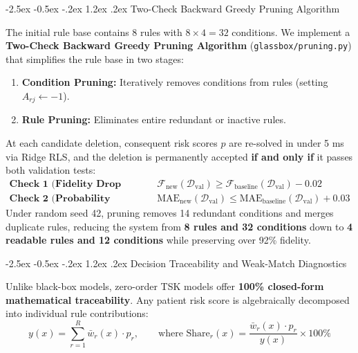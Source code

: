 \documentclass[12pt,a4paper,oneside]{report}
\makeatletter
\renewcommand\section{\@startsection {section}{1}{\z@}%
                                   {-2.5ex \@plus -0.5ex \@minus -.2ex}%
                                   {1.2ex \@plus .2ex}%
                                   {\normalfont\fontsize{13}{16}\selectfont\bfseries}}
\makeatother
\begin{document}
\section{Two-Check Backward Greedy Pruning Algorithm}

The initial rule base contains 8 rules with $8 \times 4 = 32$ conditions. We implement a \textbf{Two-Check Backward Greedy Pruning Algorithm} (\texttt{glassbox/pruning.py}) that simplifies the rule base in two stages:
\begin{enumerate}
    \setlength{\itemsep}{0pt}
    \setlength{\parskip}{0pt}
    \item \textbf{Condition Pruning:} Iteratively removes conditions from rules (setting $A_{rj} \leftarrow -1$).
    \item \textbf{Rule Pruning:} Eliminates entire redundant or inactive rules.
\end{enumerate}
At each candidate deletion, consequent risk scores $p$ are re-solved in under 5 ms via Ridge RLS, and the deletion is permanently accepted \textbf{if and only if} it passes both validation tests:
\begin{align}
    \textbf{Check 1 (Fidelity Drop Check):} & \quad \mathcal{F}_{\text{new}}(\mathcal{D}_{\text{val}}) \ge \mathcal{F}_{\text{baseline}}(\mathcal{D}_{\text{val}}) - 0.02 \\
    \textbf{Check 2 (Probability Error Check):} & \quad \text{MAE}_{\text{new}}(\mathcal{D}_{\text{val}}) \le \text{MAE}_{\text{baseline}}(\mathcal{D}_{\text{val}}) + 0.03
\end{align}
Under random seed 42, pruning removes 14 redundant conditions and merges duplicate rules, reducing the system from \textbf{8 rules and 32 conditions} down to \textbf{4 readable rules and 12 conditions} while preserving over 92\% fidelity.

\section{Decision Traceability and Weak-Match Diagnostics}

Unlike black-box models, zero-order TSK models offer \textbf{100\% closed-form mathematical traceability}. Any patient risk score is algebraically decomposed into individual rule contributions:
\begin{equation}
    y(x) = \sum_{r=1}^R \bar{w}_r(x) \cdot p_r, \qquad \text{where } \text{Share}_r(x) = \frac{\bar{w}_r(x) \cdot p_r}{y(x)} \times 100\%
\end{equation}
\end{document}
